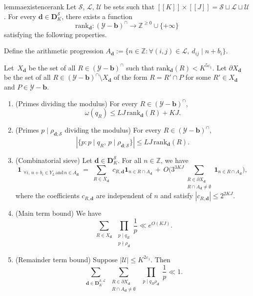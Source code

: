 \documentclass[11pt]{amsart}
\theoremstyle{definition}
\renewcommand{\leq}{\leqslant}
\renewcommand{\geq}{\geqslant}
\newcommand{\sinterval}[1]{[\![#1]\!] }
\newcommand{\abs}[1]{\left|#1\right|}
\newcommand{\ind}[1]{\mathbf{1}_{#1}}
\newcommand{\eps}{\varepsilon}
\newcommand{\Z}{\mathbb{Z}}
\newcommand{\rank}{\mathrm{rank}_{\d}}
\renewcommand{\d}{\boldsymbol{d}}
\newcommand{\pcomp}[2]{d_{#1#2}}
\newcommand{\cstH}{\eps_1}
\newcommand{\cstU}{2\eps_1}
\newcommand{\rankcutoff}{\repK^{5\cstH}}
\newcommand{\sommespart}{b}
\newcommand{\fprod}[1]{\rho_{#1}}
\newcommand{\pall}{\fprod{\d}}
\newcommand{\progression}{A_{\d}}
\newcommand{\lit}{\mathcal{L}}
\newcommand{\unlit}{\mathcal{U}}
\newcommand{\s}{\mathcal{S}}
\newcommand{\fancyD}{\mathbf{D}}
\newcommand{\Ds}{\fancyD^{\s}_{\!\repK}}
\newcommand{\Dss}{\fancyD^{\s,\lit}_{\!\repK}}
\newcommand{\elln}{L}
\newcommand{\Y}{Y_{\!\elln}}
\renewcommand{\vec}{\boldsymbol}
\newcommand{\prohibprog}{\mathcal{Y}}
\newcommand{\modulus}{q}
\newcommand{\Xd}{X_{\d}}
\newcommand{\repR}{J}
\newcommand{\repK}{K}
\newcommand{\newK}{\sinterval{K}}
\newcommand{\newR}{\sinterval{J}}
\newcommand{\shiftedprog}{\prohibprog-\vec{\sommespart}}
\newcommand{\interprog}{(\shiftedprog)^{\cap}}
\newcommand{\newerKR}{\newK\times\newR}
\begin{document}
\begin{restatable}{lemma}{existencerank}
\label{lem:existencerank}
Let $\s$, $\lit$, $\unlit$ be sets such that $\newerKR = \s\sqcup\lit\sqcup\unlit$. For every $\d \in \Ds$, there exists a function 
\begin{equation*}
	\rank : \interprog \to \Z^{\geq 0} \cup \{+\infty\}
\end{equation*}
satisfying the following properties. 

Define the arithmetic progression $\progression := \{n\in \Z : \forall (i,j)\in \lit, \ \pcomp{i}{j} \mid n+\sommespart_i\}$. 

Let~$\Xd$ be the set of all $R\in \interprog$ such that ${\rank(R) < \rankcutoff}$. Let $\partial \Xd$ be the set of all $R\in \interprog\setminus \Xd$ of the form $R = R'\cap P$ for some $R'\in \Xd$ and $P\in \shiftedprog$.
\begin{enumerate}
	\item \label{item:rank2} (Primes dividing the modulus) For every $R\in \interprog$, 
	\begin{equation*}
		\omega(\modulus_{R}) \leq \elln \repR \, \rank(R) + \repK \repR.
	\end{equation*}
	\item \label{item:rank2bis} (Primes $p\mid \fprod{\d; \s}$ dividing the modulus) For every $R\in \interprog$, 
	\begin{equation*}
		\abs{ \{p: p\mid \modulus_{R},\, p\mid \fprod{\d; \s}\}}\leq \elln \repR \, \rank(R).
	\end{equation*}
	\item \label{item:ranksieve} (Combinatorial sieve) Let $\d\in \Ds$. For all $n\in \Z$, we have 
	\begin{equation*}
		\ind{\substack{\forall i,\,n+\sommespart_i \in \Y \, \mathrm{ and }\, n\in \progression}}  = \sum_{\substack{R\in \Xd}} c_{R,\d}  \ind{n\in R\cap \progression}\,  +\,  O\Bigg(  3^{3\repK \repR}  \!\!\!\! \sum_{\substack{R\in \partial\Xd \\ R\cap \progression \neq \emptyset}} \!\!\!\! \ind{n\in R\cap \progression} \Bigg),
	\end{equation*}
	where the coefficients $c_{R,\d}$ are independent of $n$ and satisfy $|c_{R,\d}| \leq 2^{2\repK \repR}$.
	\item \label{item:rank4} (Main term bound) We have
        \begin{equation*}
        		\sum_{\substack{R\in \Xd}} \prod_{\substack{p\mid \modulus_{R}\\ p\nmid \pall}}\frac{1}{p} \ll e^{O(\repK \repR)}.
        \end{equation*}
	\item \label{item:rank3} (Remainder term bound) Suppose $|\unlit| \leq\repK^{\cstU}$. Then
	\begin{equation*}
	 \sum_{\substack{\d\in \Dss}} \sum_{\substack{R\in \partial\Xd \\ R\cap \progression \neq \emptyset}}\, \prod_{\substack{p\mid \modulus_{R} \pall}}\frac{1}{p} \ll 1.
	 \end{equation*}
\end{enumerate}
\end{restatable}
\end{document}
